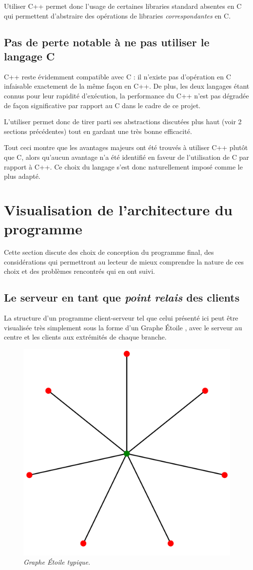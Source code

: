 \documentclass{article}
\begin{document}
Utiliser C++ permet donc l'usage de certaines libraries standard absentes en C qui permettent d'abstraire des opérations de libraries \textit{correspondantes} en C.

\subsection*{Pas de perte notable à ne pas utiliser le langage C}
C++ reste évidemment compatible avec C : il n'existe pas d'opération en C infaisable exactement de la même façon en C++.
De plus, les deux langages étant connus pour leur rapidité d'exécution, la performance du C++ n'est pas dégradée de façon significative par rapport au C dans le cadre de ce projet.

L'utiliser permet donc de tirer parti ses abstractions discutées plus haut (voir 2 sections précédentes) tout en gardant une très bonne efficacité.


Tout ceci montre que les avantages majeurs ont été trouvés à utiliser C++ plutôt que C, alors qu’aucun avantage n’a été identifié en faveur de l’utilisation de C par rapport à C++. Ce choix du langage s’est donc naturellement imposé comme le plus adapté.

\section{Visualisation de l'architecture du programme}
Cette section discute des choix de conception du programme final, des considérations qui permettront au lecteur de mieux comprendre la nature de ces choix et des problèmes rencontrés qui en ont suivi.

\subsection{Le serveur en tant que \textit{point relais} des clients}
La structure d'un programme client-serveur tel que celui présenté ici peut être visualisée très simplement sous la forme d'un Graphe Étoile \cite{Graphe Étoile}, avec le serveur au centre et les clients aux extrémités de chaque branche. 
\begin{figure}[ht]
    \centering
    \includegraphics[width=0.25\linewidth]{etoile.png}
    \caption{\textit{Graphe Étoile typique.}}
\end{figure}
\end{document}
